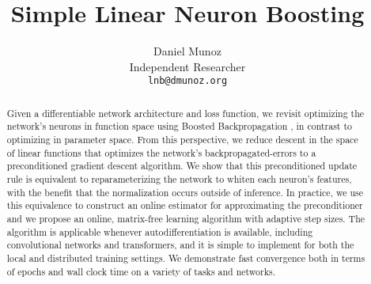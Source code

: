 \documentclass{article}
\title{Simple Linear Neuron Boosting}
\author{Daniel Munoz \\
        Independent Researcher \\
	\texttt{lnb@dmunoz.org}
}
\begin{document}
\maketitle

\begin{abstract}
Given a differentiable network architecture and loss function, we revisit optimizing the network's
neurons in function space using Boosted Backpropagation \citep{grub2010}, in contrast to optimizing
in parameter space. From this perspective, we reduce descent in the space of linear functions that optimizes
the network's backpropagated-errors to a preconditioned gradient descent algorithm. We show that this
preconditioned update rule is equivalent to reparameterizing the network to whiten each neuron's features,
with the benefit that the normalization occurs outside of inference. In practice, we use this equivalence to
construct an online estimator for approximating the preconditioner and we propose an online, matrix-free
learning algorithm with adaptive step sizes. The algorithm is applicable whenever autodifferentiation is
available, including convolutional networks and transformers, and it is simple to implement for both the
local and distributed training settings. We demonstrate fast convergence both in terms of epochs and wall
clock time on a variety of tasks and networks.
\end{abstract}








\end{document}

